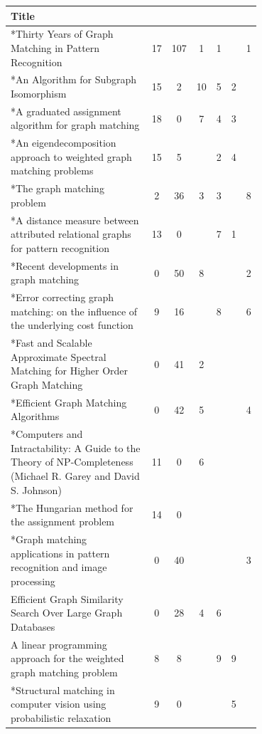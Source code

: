 \documentclass[12pt]{thesis}
\theoremstyle{plain}
\theoremstyle{definition}
\theoremstyle{remark}
\begin{document}
\begin{table}[H]
{\fontsize{10.5}{13}\selectfont
\begin{tabular}{|L{0.7\linewidth}|c|c|c|c|c|c|}
\hline
Title &  &   &  &   &   &  \\ \hline\hline
*Thirty Years of Graph Matching in Pattern Recognition & 17 & 107 & 1 & 1 &  & 1 \\ \hline
*An Algorithm for Subgraph Isomorphism & 15 & 2 & 10 & 5 & 2 &  \\ \hline
*A graduated assignment algorithm for graph matching & 18 & 0 & 7 & 4 & 3 &  \\ \hline
*An eigendecomposition approach to weighted graph matching problems & 15 & 5 &  & 2 & 4 &  \\ \hline
*The graph matching problem & 2 & 36 & 3 & 3 &  & 8 \\ \hline
*A distance measure between attributed relational graphs for pattern recognition & 13 & 0 &  & 7 & 1 &  \\ \hline
*Recent developments in graph matching & 0 & 50 & 8 &  &  & 2 \\ \hline
*Error correcting graph matching: on the influence of the underlying cost function & 9 & 16 &  & 8 &  & 6 \\ \hline
*Fast and Scalable Approximate Spectral Matching for Higher Order Graph Matching & 0 & 41 & 2 &  &  &  \\ \hline
*Efficient Graph Matching Algorithms & 0 & 42 & 5 &  &  & 4 \\ \hline
*Computers and Intractability: A Guide to the Theory of NP-Completeness (Michael R. Garey and David S. Johnson) & 11 & 0 & 6 &  &  &  \\ \hline
*The Hungarian method for the assignment problem & 14 & 0 &  &  &  &  \\ \hline
*Graph matching applications in pattern recognition and image processing & 0 & 40 &  &  &  & 3 \\ \hline
Efficient Graph Similarity Search Over Large Graph Databases & 0 & 28 & 4 & 6 &  &  \\ \hline
A linear programming approach for the weighted graph matching problem & 8 & 8 &  & 9 & 9 &  \\ \hline
*Structural matching in computer vision using probabilistic relaxation & 9 & 0 &  &  & 5 &  \\ \hline

\end{tabular}}
\end{table}
\end{document}

